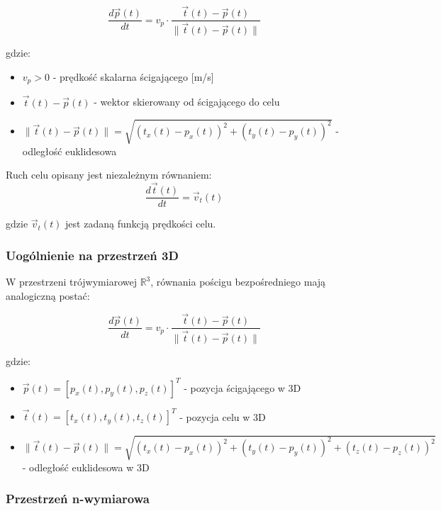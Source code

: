 \documentclass[12pt,a4paper]{article}
\begin{document}
\begin{equation}
\frac{d\vec{p}(t)}{dt} = v_p \cdot \frac{\vec{t}(t) - \vec{p}(t)}{\|\vec{t}(t) - \vec{p}(t)\|}
\label{eq:direct_pursuit_2d}
\end{equation}

gdzie:
\begin{itemize}
    \item $v_p > 0$ - prędkość skalarna ścigającego [m/s]
    \item $\vec{t}(t) - \vec{p}(t)$ - wektor skierowany od ścigającego do celu
    \item $\|\vec{t}(t) - \vec{p}(t)\| = \sqrt{(t_x(t) - p_x(t))^2 + (t_y(t) - p_y(t))^2}$ - odległość euklidesowa
\end{itemize}

Ruch celu opisany jest niezależnym równaniem:
\begin{equation}
\frac{d\vec{t}(t)}{dt} = \vec{v}_t(t)
\label{eq:target_motion}
\end{equation}

gdzie $\vec{v}_t(t)$ jest zadaną funkcją prędkości celu.

\subsubsection{Uogólnienie na przestrzeń 3D}

W przestrzeni trójwymiarowej $\mathbb{R}^3$, równania pościgu bezpośredniego mają analogiczną postać:

\begin{equation}
\frac{d\vec{p}(t)}{dt} = v_p \cdot \frac{\vec{t}(t) - \vec{p}(t)}{\|\vec{t}(t) - \vec{p}(t)\|}
\end{equation}

gdzie:
\begin{itemize}
    \item $\vec{p}(t) = [p_x(t), p_y(t), p_z(t)]^T$ - pozycja ścigającego w 3D
    \item $\vec{t}(t) = [t_x(t), t_y(t), t_z(t)]^T$ - pozycja celu w 3D
    \item $\|\vec{t}(t) - \vec{p}(t)\| = \sqrt{(t_x(t) - p_x(t))^2 + (t_y(t) - p_y(t))^2 + (t_z(t) - p_z(t))^2}$ - odległość euklidesowa w 3D
\end{itemize}

\subsubsection{Przestrzeń n-wymiarowa}
\end{document}
